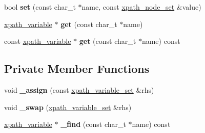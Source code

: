 \begin{DoxyCompactItemize}
\item 
\mbox{\label{classpugi_1_1xpath__variable__set_a5835902a2662631836cc6457709b84ec}} 
bool {\bfseries set} (const char\+\_\+t $\ast$name, const \hyperlink{classpugi_1_1xpath__node__set}{xpath\+\_\+node\+\_\+set} \&value)
\item 
\mbox{\label{classpugi_1_1xpath__variable__set_aca5af5d65cdf0f639890cc1d3caec610}} 
\hyperlink{classpugi_1_1xpath__variable}{xpath\+\_\+variable} $\ast$ {\bfseries get} (const char\+\_\+t $\ast$name)
\item 
\mbox{\label{classpugi_1_1xpath__variable__set_a4a3c9f6893f5f7058f8c742ad80e835f}} 
const \hyperlink{classpugi_1_1xpath__variable}{xpath\+\_\+variable} $\ast$ {\bfseries get} (const char\+\_\+t $\ast$name) const
\end{DoxyCompactItemize}
\subsection*{Private Member Functions}
\begin{DoxyCompactItemize}
\item 
\mbox{\label{classpugi_1_1xpath__variable__set_a7313c2c7296f265361e13b86190338f4}} 
void {\bfseries \+\_\+assign} (const \hyperlink{classpugi_1_1xpath__variable__set}{xpath\+\_\+variable\+\_\+set} \&rhs)
\item 
\mbox{\label{classpugi_1_1xpath__variable__set_a072dc8b979865e90e622b383297fbf08}} 
void {\bfseries \+\_\+swap} (\hyperlink{classpugi_1_1xpath__variable__set}{xpath\+\_\+variable\+\_\+set} \&rhs)
\item 
\mbox{\label{classpugi_1_1xpath__variable__set_ad5cdee3542fb03d310fad44a68026e18}} 
\hyperlink{classpugi_1_1xpath__variable}{xpath\+\_\+variable} $\ast$ {\bfseries \+\_\+find} (const char\+\_\+t $\ast$name) const
\end{DoxyCompactItemize}
